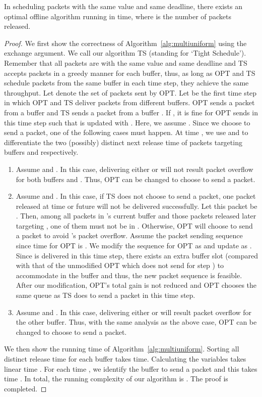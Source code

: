 \documentclass[final, 11pt]{article}
\begin{document}
\begin{theorem}
In scheduling packets with the same value and same deadline, there exists an optimal offline algorithm running in  time, where  is the number of packets released.
\label{theorem:uniformoff}
\end{theorem}

\begin{proof}
We first show the correctness of Algorithm~\ref{alg:multiuniform} using the exchange argument. We call our algorithm TS (standing for `Tight Schedule'). Remember that all packets are with the same value and same deadline and TS accepts packets in a greedy manner for each buffer, thus, as long as OPT and TS schedule packets from the same buffer in each time step, they achieve the same throughput. Let  denote the set of packets sent by OPT. Let  be the first time step in which OPT and TS deliver packets from different buffers. OPT sends a packet  from a buffer  and TS sends a packet  from a buffer . If , it is fine for OPT sends  in this time step such that  is updated with . Here, we assume . Since we choose  to send a packet, one of the following cases must happen. At time , we use  and  to differentiate the two (possibly) distinct next release time of packets targeting buffers  and  respectively.

\begin{enumerate}
\item Assume  and . In this case, delivering either  or  will not result packet overflow for both buffers  and . Thus, OPT can be changed to choose  to send a packet.

\item Assume  and . In this case, if TS does not choose  to send a packet, one packet released at time  or future will not be delivered successfully. Let this packet be . Then, among all packets in 's current buffer and those packets released later targeting , one of them must not be in . Otherwise, OPT will choose  to send a packet to avoid 's packet overflow. Assume the packet sending sequence since time  for OPT is . We modify the sequence for OPT as  and update  as . Since  is delivered in this time step, there exists an extra buffer slot (compared with that of the unmodified OPT which does not send  for step ) to accommodate  in the buffer  and thus, the new packet sequence is feasible. After our modification, OPT's total gain is not reduced and OPT chooses the same queue as TS does to send a packet in this time step.

\item Assume  and . In this case, delivering either  or  will result packet overflow for the other buffer. Thus, with the same analysis as the above case, OPT can be changed to choose  to send a packet.
\end{enumerate}

We then show the running time of Algorithm~\ref{alg:multiuniform}. Sorting all distinct release time for each buffer takes  time. Calculating the variables  takes linear time . For each time , we identify the buffer to send a packet and this takes time . In total, the running complexity of our algorithm is . The proof is completed. 
\end{proof}
\end{document}
